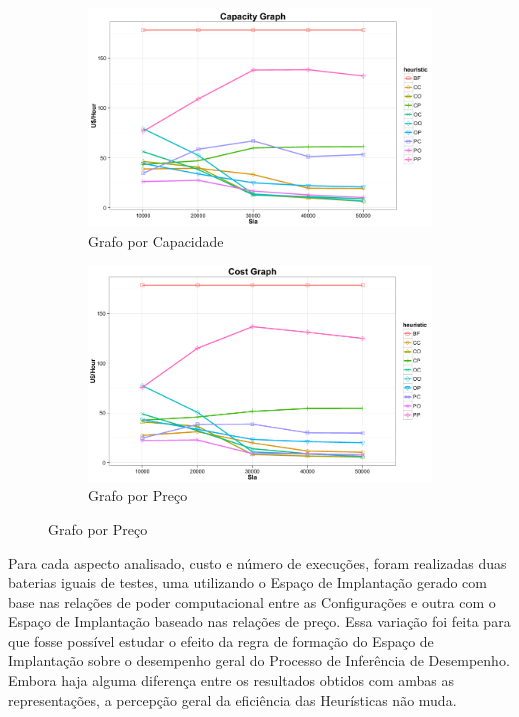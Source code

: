 \begin{figure}[hbt]
  \caption{\label{fig:eficiencia_custo}Avaliação da Eficiência de Custo das Heurísticas}
  \centering
    \begin{subfigure}[a]{0.7\textwidth}
      \includegraphics[width=\textwidth]{img/ExecutionCost-Capacity}
      \caption{Grafo por Capacidade}
      \label{fig:eficiencia_custo_capacidade}
    \end{subfigure}
    \begin{subfigure}[b]{0.7\textwidth}
      \includegraphics[width=\textwidth]{img/ExecutionCost-Price}
      \caption{Grafo por Preço}
      \label{fig:eficiencia_custo_preco}
    \end{subfigure}
\end{figure}

Para cada aspecto analisado, custo e número de execuções, foram realizadas duas 
baterias iguais de testes, uma utilizando o Espaço de Implantação gerado com base 
nas relações de poder computacional entre as Configurações e outra com o Espaço de 
Implantação baseado nas relações de preço. Essa variação foi feita para que fosse
possível estudar o efeito da regra de formação do Espaço de Implantação sobre o
desempenho geral do Processo de Inferência de Desempenho. Embora haja alguma 
diferença entre os resultados obtidos com ambas as representações, a percepção 
geral da eficiência das Heurísticas não muda.   

